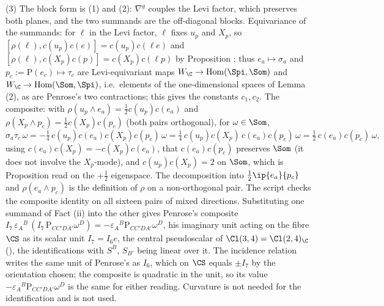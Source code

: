 (3) The block form is (1) and (2): $\nabla^g$ couples the Levi factor, which preserves both planes, and the two summands are the off-diagonal blocks. Equivariance of the summands: for $\ell$ in the Levi factor, $\ell$ fixes $u_p$ and $X_p$, so $[\rho(\ell), c(u_p)c(e)] = c(u_p)c(\ell e)$ and $[\rho(\ell), c(X_p)c(p)] = c(X_p)c(\ell p)$ by Proposition ; thus $e_a \mapsto \sigma_a$ and $p_c := \mathrm{P}(e_c) \mapsto \tau_c$ are Levi-equivariant maps $W_\C \to \operatorname{Hom}(\Spi,\Som)$ and $W_\C\to\operatorname{Hom}(\Som,\Spi)$, i.e.\ elements of the one-dimensional spaces of Lemma (2), as are Penrose's two contractions; this gives the constants $c_1, c_2$. The composite: with $\rho(u_p\wedge e_a) = \tfrac12 c(u_p)c(e_a)$ and $\rho(X_p\wedge p_c) = \tfrac12 c(X_p)c(p_c)$ (both pairs orthogonal), for $\omega \in \Som$,
\[
\sigma_a\tau_c\,\omega = -\tfrac14\,c(u_p)c(e_a)c(X_p)c(p_c)\,\omega = \tfrac14\,c(u_p)c(X_p)\,c(e_a)c(p_c)\,\omega = \tfrac12\,c(e_a)c(p_c)\,\omega ,
\]
using $c(e_a)c(X_p) = -c(X_p)c(e_a)$, that $c(e_a)c(p_c)$ preserves $\Som$ (it does not involve the $X_p$-mode), and $c(u_p)c(X_p) = 2$ on $\Som$, which is Proposition  read on the $+\tfrac12$ eigenspace. The decomposition into $\tfrac12\ip{e_a}{p_c}$ and $\rho(e_a\wedge p_c)$ is the definition of $\rho$ on a non-orthogonal pair. The script checks the composite identity on all sixteen pairs of mixed directions. Substituting one summand of Fact (ii) into the other gives Penrose's composite $I_7\,\varepsilon_A{}^B\,(I_7\,\mathrm{P}_{CC'DA'}\omega^D) = -\varepsilon_A{}^B\mathrm{P}_{CC'DA'}\omega^D$, his imaginary unit acting on the fibre $\CS$ as its scalar unit $I_7 = I_6e$, the central pseudoscalar of $\Cl(3,4) = \Cl(2,4)_\C$ (), the identifications with $S^B$, $S_{B'}$ being linear over it. The incidence relation writes the same unit of Penrose's as $I_6$, which on $\CS$ equals $\pm I_7$ by the orientation chosen; the composite is quadratic in the unit, so its value $-\varepsilon_A{}^B\mathrm{P}_{CC'DA'}\omega^D$ is the same for either reading. Curvature is not needed for the identification and is not used.
